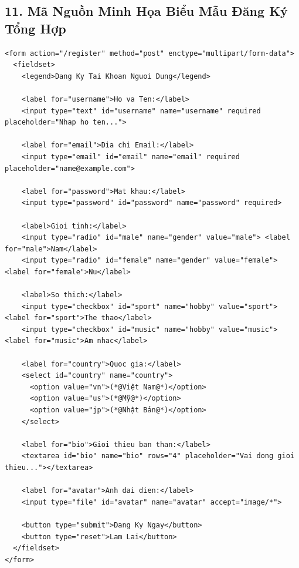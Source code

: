 \documentclass[11pt,oneside]{book}
\begin{document}
\subsection{11. Mã Nguồn Minh Họa Biểu Mẫu Đăng Ký Tổng Hợp}

\begin{codeWindowBreakable}
\begin{lstlisting}[language=HTML5]
<form action="/register" method="post" enctype="multipart/form-data">
  <fieldset>
    <legend>Dang Ky Tai Khoan Nguoi Dung</legend>
    
    <label for="username">Ho va Ten:</label>
    <input type="text" id="username" name="username" required placeholder="Nhap ho ten...">
    
    <label for="email">Dia chi Email:</label>
    <input type="email" id="email" name="email" required placeholder="name@example.com">
    
    <label for="password">Mat khau:</label>
    <input type="password" id="password" name="password" required>
    
    <label>Gioi tinh:</label>
    <input type="radio" id="male" name="gender" value="male"> <label for="male">Nam</label>
    <input type="radio" id="female" name="gender" value="female"> <label for="female">Nu</label>
    
    <label>So thich:</label>
    <input type="checkbox" id="sport" name="hobby" value="sport"> <label for="sport">The thao</label>
    <input type="checkbox" id="music" name="hobby" value="music"> <label for="music">Am nhac</label>
    
    <label for="country">Quoc gia:</label>
    <select id="country" name="country">
      <option value="vn">(*@Việt Nam@*)</option>
      <option value="us">(*@Mỹ@*)</option>
      <option value="jp">(*@Nhật Bản@*)</option>
    </select>
    
    <label for="bio">Gioi thieu ban than:</label>
    <textarea id="bio" name="bio" rows="4" placeholder="Vai dong gioi thieu..."></textarea>
    
    <label for="avatar">Anh dai dien:</label>
    <input type="file" id="avatar" name="avatar" accept="image/*">
    
    <button type="submit">Dang Ky Ngay</button>
    <button type="reset">Lam Lai</button>
  </fieldset>
</form>
\end{lstlisting}
\end{codeWindowBreakable}
\end{document}
